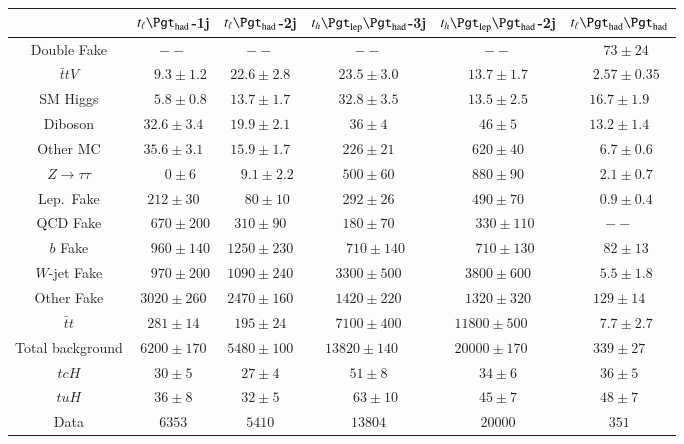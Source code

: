 \begin{table}[htbp]
\begin{tabular}{cccccc} \toprule\toprule
 & $t_\ell\tauhad$-1j & $t_\ell\tauhad$-2j & $t_h\tlhad$-3j &$t_h\tlhad$-2j  & $t_\ell\thadhad$ \\\midrule
  Double Fake            & $--       $  & $--       $  & $--       $  &  $--       $  & ~~$73 \pm 24    $ \\ 
  $\bar{t}tV$            & ~~$9.3 \pm 1.2 $  & $22.6 \pm 2.8$  & $23.5 \pm 3.0$  &  $13.7 \pm 1.7$  & ~~$2.57 \pm 0.35$ \\ 
  SM Higgs               & ~~$5.8 \pm 0.8 $  & $13.7 \pm 1.7$  & $32.8 \pm 3.5$  &  $13.5 \pm 2.5$  & $16.7 \pm 1.9 $ \\ 
  Diboson                & $32.6 \pm 3.4$  & $19.9 \pm 2.1$  & $36 \pm 4    $  &  $46 \pm 5    $  & $13.2 \pm 1.4 $ \\ 
  Other MC               & $35.6 \pm 3.1$  & $15.9 \pm 1.7$  & $226 \pm 21  $  &  $620 \pm 40  $  & ~~$6.7 \pm 0.6  $  \\ 
  $Z\rightarrow\tau\tau$ & ~~$0 \pm 6     $  & ~~$9.1 \pm 2.2 $  & $500 \pm 60  $  &  $880 \pm 90  $  & ~~$2.1 \pm 0.7  $ \\ 
  Lep.\ Fake               & $212 \pm 30  $  & ~~$80 \pm 10   $  & $292 \pm 26  $  &  $490 \pm 70  $  & ~~$0.9 \pm 0.4  $ \\ 
  QCD Fake               & ~~$670 \pm 200 $  & $310 \pm 90  $  & $180 \pm 70  $  &  ~~$330 \pm 110 $  & $--        $  \\ 
  $b$ Fake                 & ~~$960 \pm 140 $  & $1250 \pm 230$  & ~~$710 \pm 140 $  &  ~~$710 \pm 130 $  & ~~$82 \pm 13    $ \\ 
  $W$-jet Fake             & ~~$970 \pm 200 $  & $1090 \pm 240$  & $3300 \pm 500$  &  $3800 \pm 600$  & ~~$5.5 \pm 1.8  $ \\ 
  Other Fake             & $3020 \pm 260$  & $2470 \pm 160$  & $1420 \pm 220$  &  $1320 \pm 320$  & $129 \pm 14   $ \\ 
  $\bar{t}t$             & $281 \pm 14  $  & $195 \pm 24  $  & $7100 \pm 400$  &  $11800 \pm 500$~~ & ~~$7.7 \pm 2.7  $ \\ \midrule
  Total background       & $6200 \pm 170$  & $5480 \pm 100$  & $13820 \pm 140$~~ &  $20000 \pm 170$~~ & $339 \pm 27   $ \\  \midrule
  $tcH$                    & $30 \pm 5    $  & $27 \pm 4    $  & $51 \pm 8    $  &  $34 \pm 6    $  & $36 \pm 5     $ \\
  $tuH$                    & $36 \pm 8    $  & $32 \pm 5    $  & ~~$63 \pm 10   $  &  $45 \pm 7    $  & $48 \pm 7     $ \\ \midrule
  Data                   & $6353        $  & $5410        $  & $13804       $  &  $20000       $  & $351          $ \\ 
\bottomrule\bottomrule
\end{tabular}\\





\end{table}
